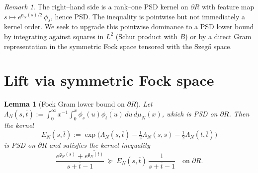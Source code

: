 \documentclass[11pt]{article}
\newtheorem{lemma}{Lemma}
\theoremstyle{remark}
\newtheorem{remark}{Remark}
\begin{document}
\begin{remark}
The right--hand side is a rank--one PSD kernel on $\partial R$ with feature map $s\mapsto e^{\mathfrak g_N(s)/2}\,\phi_s$, hence PSD. The inequality is pointwise but not immediately a kernel order. We seek to upgrade this pointwise dominance to a PSD lower bound by integrating against squares in $L^2$ (Schur product with $B$) or by a direct Gram representation in the symmetric Fock space tensored with the Szeg\H{o} space.
\end{remark}

\section*{Lift via symmetric Fock space}
\begin{lemma}[Fock Gram lower bound on $\partial R$]\label{lem:fock-lower}
Let $\Lambda_N(s,\overline t):=\int_0^\infty x^{-1}\int_0^x \phi_s(u)\overline{\phi_t(u)}\,du\,d\mu_N(x)$, which is PSD on $\partial R$. Then the kernel
\[E_N(s,\overline t):=\exp\Big(\Lambda_N(s,\overline t)-\tfrac12\Lambda_N(s,\overline s)-\tfrac12\Lambda_N(t,\overline t)\Big)
\]
is PSD on $\partial R$ and satisfies the kernel inequality
\[\frac{e^{\mathfrak g_N(s)}+\overline{e^{\mathfrak g_N(t)}}}{s+\overline t-1}\ \succeq\ E_N(s,\overline t)\,\frac{1}{s+\overline t-1}\quad\text{on }\partial R.
\]
\end{lemma}
\end{document}
